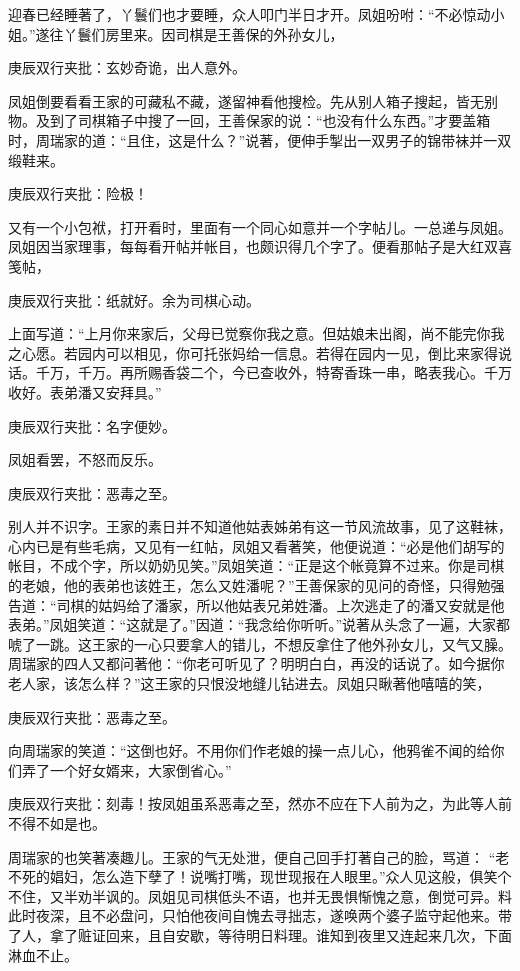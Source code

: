\begin{parag}
    迎春已经睡著了，丫鬟们也才要睡，众人叩门半日才开。凤姐吩咐：“不必惊动小姐。”遂往丫鬟们房里来。因司棋是王善保的外孙女儿，\begin{note}庚辰双行夹批：玄妙奇诡，出人意外。\end{note}凤姐倒要看看王家的可藏私不藏，遂留神看他搜检。先从别人箱子搜起，皆无别物。及到了司棋箱子中搜了一回，王善保家的说：“也没有什么东西。”才要盖箱时，周瑞家的道：“且住，这是什么？”说著，便伸手掣出一双男子的锦带袜并一双缎鞋来。\begin{note}庚辰双行夹批：险极！\end{note}又有一个小包袱，打开看时，里面有一个同心如意并一个字帖儿。一总递与凤姐。凤姐因当家理事，每每看开帖并帐目，也颇识得几个字了。便看那帖子是大红双喜笺帖，\begin{note}庚辰双行夹批：纸就好。余为司棋心动。\end{note}上面写道：“上月你来家后，父母已觉察你我之意。但姑娘未出阁，尚不能完你我之心愿。若园内可以相见，你可托张妈给一信息。若得在园内一见，倒比来家得说话。千万，千万。再所赐香袋二个，今已查收外，特寄香珠一串，略表我心。千万收好。表弟潘又安拜具。”\begin{note}庚辰双行夹批：名字便妙。\end{note}凤姐看罢，不怒而反乐。\begin{note}庚辰双行夹批：恶毒之至。\end{note}别人并不识字。王家的素日并不知道他姑表姊弟有这一节风流故事，见了这鞋袜，心内已是有些毛病，又见有一红帖，凤姐又看著笑，他便说道：“必是他们胡写的帐目，不成个字，所以奶奶见笑。”凤姐笑道：“正是这个帐竟算不过来。你是司棋的老娘，他的表弟也该姓王，怎么又姓潘呢？”王善保家的见问的奇怪，只得勉强告道：“司棋的姑妈给了潘家，所以他姑表兄弟姓潘。上次逃走了的潘又安就是他表弟。”凤姐笑道：“这就是了。”因道：“我念给你听听。”说著从头念了一遍，大家都唬了一跳。这王家的一心只要拿人的错儿，不想反拿住了他外孙女儿，又气又臊。周瑞家的四人又都问著他：“你老可听见了？明明白白，再没的话说了。如今据你老人家，该怎么样？”这王家的只恨没地缝儿钻进去。凤姐只瞅著他嘻嘻的笑，\begin{note}庚辰双行夹批：恶毒之至。\end{note}向周瑞家的笑道：“这倒也好。不用你们作老娘的操一点儿心，他鸦雀不闻的给你们弄了一个好女婿来，大家倒省心。”\begin{note}庚辰双行夹批：刻毒！按凤姐虽系恶毒之至，然亦不应在下人前为之，为此等人前不得不如是也。\end{note}周瑞家的也笑著凑趣儿。王家的气无处泄，便自己回手打著自己的脸，骂道： “老不死的娼妇，怎么造下孽了！说嘴打嘴，现世现报在人眼里。”众人见这般，俱笑个不住，又半劝半讽的。凤姐见司棋低头不语，也并无畏惧惭愧之意，倒觉可异。料此时夜深，且不必盘问，只怕他夜间自愧去寻拙志，遂唤两个婆子监守起他来。带了人，拿了赃证回来，且自安歇，等待明日料理。谁知到夜里又连起来几次，下面淋血不止。
\end{parag}


